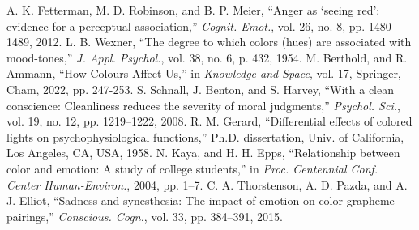 \documentclass[conference]{IEEEtran}
\begin{document}
	
	\begin{thebibliography}{00}
		 A. K. Fetterman, M. D. Robinson, and B. P. Meier, ``Anger as `seeing red': evidence for a perceptual association,'' \textit{Cognit. Emot.}, vol. 26, no. 8, pp. 1480--1489, 2012.
		 L. B. Wexner, ``The degree to which colors (hues) are associated with mood-tones,'' \textit{J. Appl. Psychol.}, vol. 38, no. 6, p. 432, 1954.
		 M. Berthold, and R. Ammann, ``How Colours Affect Us,'' in \textit{Knowledge and Space}, vol. 17, Springer, Cham, 2022, pp. 247-253.
		 S. Schnall, J. Benton, and S. Harvey, ``With a clean conscience: Cleanliness reduces the severity of moral judgments,'' \textit{Psychol. Sci.}, vol. 19, no. 12, pp. 1219--1222, 2008.
		 R. M. Gerard, ``Differential effects of colored lights on psychophysiological functions,'' Ph.D. dissertation, Univ. of California, Los Angeles, CA, USA, 1958.
		 N. Kaya, and H. H. Epps, ``Relationship between color and emotion: A study of college students,'' in \textit{Proc. Centennial Conf. Center Human-Environ.}, 2004, pp. 1--7.
		 C. A. Thorstenson, A. D. Pazda, and A. J. Elliot, ``Sadness and synesthesia: The impact of emotion on color-grapheme pairings,'' \textit{Conscious. Cogn.}, vol. 33, pp. 384--391, 2015.
	\end{thebibliography}
	
\end{document}
